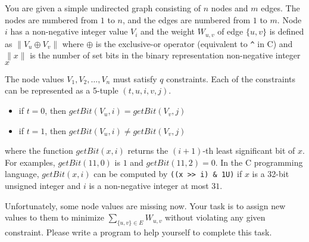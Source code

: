 You are given a simple undirected graph consisting of $n$ nodes and $m$ edges. 
The nodes are numbered from $1$ to $n$, 
and the edges are numbered from $1$ to $m$.
Node $i$ has a non-negative integer value $V_i$ and the weight $W_{u,v}$ of 
edge $\{u, v\}$ is defined as $\left\|V_u\oplus V_v\right\|$
where $\oplus$ is the exclusive-or operator (equivalent to \verb+^+ in C) and
$\|x\|$ is the number of set bits in the binary representation non-negative
integer $x$

The node values $V_1,V_2,\dots,V_n$ must satisfy $q$ constraints.
Each of the constraints can be represented as 
a 5-tuple $(t,u,i,v,j)$.
\begin{itemize}
\item if $t = 0$, then $getBit(V_u, i) = getBit(V_v, j)$
\item if $t = 1$, then $getBit(V_u, i) \neq getBit(V_v, j)$
\end{itemize}
where the function $getBit(x, i)$ returns the $(i+1)$-th least significant
bit of $x$. For examples, $getBit(11, 0)$ is $1$ and $getBit(11,2)=0$. 
In the C programming language, $getBit(x, i)$ can be computed by 
\verb+((x >> i) & 1U)+ if $x$ is a 32-bit unsigned integer 
and $i$ is a non-negative integer at most $31$.

Unfortunately, some node values are missing now. 
Your task is to assign new values to them to minimize 
$\sum_{\{u,v\} \in E}W_{u,v}$ without violating any given constraint. 
Please write a program to help yourself to complete this task.
